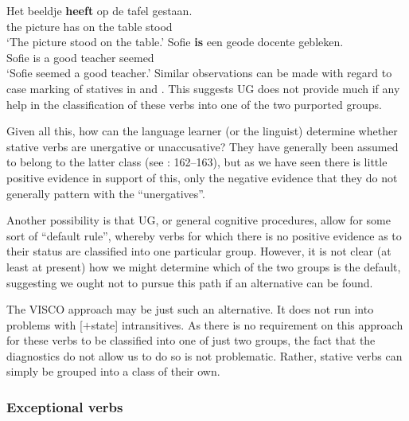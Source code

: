 \documentclass[output=paper]{langsci/langscibook}
\begin{document}
\ea {} \parencite[870]{Sorace2000}
    \ea
        \gll    Het   beeldje \textbf{heeft} op   de   tafel   gestaan.\\
                the   picture   has   on   the   table   stood\\
        \glt    \enquote*{The picture stood on the table.}
    \ex
        \gll   Sofie \textbf{is} een   geode   docente   gebleken.\\
               Sofie is a   good   teacher   seemed\\
        \glt   \enquote*{Sofie seemed a good teacher.}
    \z
\z
Similar observations can be made with regard to case marking of statives in
 and  \parencite{Baker2018}. This suggests
\gls{UG} does not provide much if any help in the
classification of these verbs into one of the two purported groups.

\largerpage[1]
Given all this, how can the language learner (or the linguist) determine
whether  stative verbs are unergative or unaccusative? They have
generally been assumed to belong to the latter class (see
\citealt{Perlmutter1978}: 162–163), but as we have seen there is little
positive evidence in support of this, only the negative evidence that they do
not generally pattern with the \enquote{unergatives}.

Another possibility is that \gls{UG}, or general cognitive procedures, allow for some
sort of \enquote{default rule}, whereby verbs for which there is no positive
evidence as to their status are classified into one particular group. However,
it is not clear (at least at present) how we might determine which of the two
groups is the default, suggesting we ought not to pursue this path if an
alternative can be found.

The VISCO approach may be just such an alternative. It does not run into
problems with [$+$state] intransitives. As there is no requirement on this
approach for these verbs to be classified into one of just two groups, the fact
that the diagnostics do not allow us to do so is not problematic. Rather,
stative verbs can simply be grouped into a class of their own.

\subsubsection{Exceptional verbs}
\end{document}
